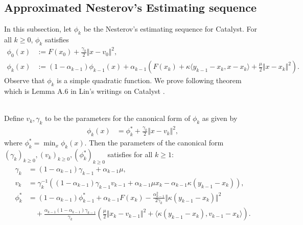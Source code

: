 \documentclass[12pt]{article}
\begin{document}
    \subsection{Approximated Nesterov's Estimating sequence}
        In this subsection, let $\phi_k$ be the Nesterov's estimating sequence for Catalyst. 
        For all $k \ge0$, $\phi_k$ satisfies 
        \begin{align*}
            \phi_0(x) &:= F(x_0) + \frac{\gamma_0}{2}\Vert x - v_0\Vert^2, 
            \\
            \phi_k(x) &:= 
            (1 - \alpha_{k - 1})\phi_{k - 1}(x) + 
            \alpha_{k - 1}\left(
                F(x_k) + \kappa\langle y_{k - 1} - x_k, x - x_k\rangle
                + \frac{\mu}{2} \Vert x - x_k\Vert^2
            \right). 
        \end{align*}
        Observe that $\phi_k$ is a simple quadratic function. 
        We prove following theorem which is Lemma A.6 in Lin's writings on Catalyst \cite{lin_universal_2015}. 
        \begin{theorem}\;\\
            Define $v_k, \gamma_k$ to be the parameters for the canonical form of $\phi_k$ as given by 
            \begin{align*}
                \phi_k(x) &= \phi_k^* + \frac{\gamma_k}{2}\Vert x - v_k\Vert^2, 
            \end{align*}
            where $\phi_k^* = \min_x \phi_k(x)$. 
            Then the parameters of the canonical form $(\gamma_{k})_{k \ge0}, (v_k)_{k \ge 0}, (\phi_k^*)_{k\ge 0}$ satisfies for all $k \ge 1$: 
            \begin{align*}
                \gamma_k &= (1 - \alpha_{k - 1})\gamma_{k - 1} + \alpha_{k - 1}\mu, 
                \\
                v_k &= 
                \gamma_k^{-1}(
                    (1 - \alpha_{k - 1})\gamma_{k - 1}v_{k - 1}
                    + \alpha_{k - 1}\mu x_k - \alpha_{k - 1}\kappa(y_{k - 1} - x_k)
                ), 
                \\
                \phi_k^* &= (1 - \alpha_{k - 1})\phi_{k - 1}^*
                + \alpha_{k - 1}F(x_k)
                - \frac{\alpha_{k - 1}^2}{2\gamma_k}\Vert \kappa(y_{k - 1} - x_k)\Vert^2
                \\
                &\quad 
                + \frac{\alpha_{k - 1}(1 - \alpha_{k - 1})\gamma_{k - 1}}{\gamma_k}
                \left(
                    \frac{\mu}{2}\Vert x_k - v_{k - 1}\Vert^2 + 
                    \langle \kappa(y_{k - 1} - x_k), v_{k - 1} - x_k\rangle
                \right). 
            \end{align*}
        \end{theorem}
\end{document}
